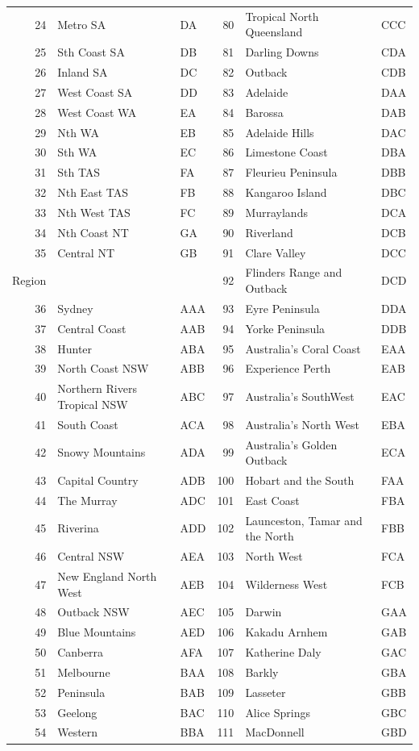 \documentclass[11pt,a4paper,]{article}
\let\origtable\table
\let\endorigtable\endtable
\renewenvironment{table}[1][2] {
    \expandafter\origtable\expandafter[htbp]
} {
    \endorigtable
}
\begin{document}
\begin{table}[t]
\begin{tabular}{rllrll}
24 & Metro SA & DA & 80 & Tropical North Queensland & CCC\\
25 & Sth Coast SA & DB & 81 & Darling Downs & CDA\\
26 & Inland SA & DC & 82 & Outback & CDB\\
27 & West Coast SA & DD & 83 & Adelaide & DAA\\
28 & West Coast WA & EA & 84 & Barossa & DAB\\
29 & Nth WA & EB & 85 & Adelaide Hills & DAC\\
30 & Sth WA & EC & 86 & Limestone Coast & DBA\\
31 & Sth TAS & FA & 87 & Fleurieu Peninsula & DBB\\
32 & Nth East TAS & FB & 88 & Kangaroo Island & DBC\\
33 & Nth West TAS & FC & 89 & Murraylands & DCA\\
34 & Nth Coast NT & GA & 90 & Riverland & DCB\\
35 & Central NT & GB & 91 & Clare Valley & DCC\\
Region &  &  & 92 & Flinders Range and Outback & DCD\\
36 & Sydney & AAA & 93 & Eyre Peninsula & DDA\\
37 & Central Coast & AAB & 94 & Yorke Peninsula & DDB\\
38 & Hunter & ABA & 95 & Australia's Coral Coast & EAA\\
39 & North Coast NSW & ABB & 96 & Experience Perth & EAB\\
40 & Northern Rivers Tropical NSW & ABC & 97 & Australia's SouthWest & EAC\\
41 & South Coast & ACA & 98 & Australia's North West & EBA\\
42 & Snowy Mountains & ADA & 99 & Australia's Golden Outback & ECA\\
43 & Capital Country & ADB & 100 & Hobart and the South & FAA\\
44 & The Murray & ADC & 101 & East Coast & FBA\\
45 & Riverina & ADD & 102 & Launceston, Tamar and the North & FBB\\
46 & Central NSW & AEA & 103 & North West & FCA\\
47 & New England North West & AEB & 104 & Wilderness West & FCB\\
48 & Outback NSW & AEC & 105 & Darwin & GAA\\
49 & Blue Mountains & AED & 106 & Kakadu Arnhem & GAB\\
50 & Canberra & AFA & 107 & Katherine Daly & GAC\\
51 & Melbourne & BAA & 108 & Barkly & GBA\\
52 & Peninsula & BAB & 109 & Lasseter & GBB\\
53 & Geelong & BAC & 110 & Alice Springs & GBC\\
54 & Western & BBA & 111 & MacDonnell & GBD\\
\bottomrule
\end{tabular}
\end{table}
\end{document}
